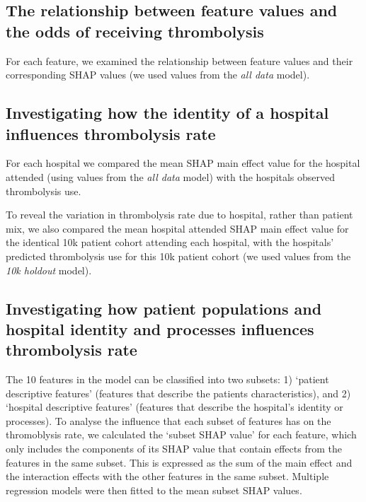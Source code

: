 \subsection{The relationship between feature values and the odds of receiving thrombolysis}

For each feature, we examined the relationship between feature values and their corresponding SHAP values (we used values from the \emph{all data} model).

\subsection{Investigating how the identity of a hospital influences thrombolysis rate}

For each hospital we compared the mean SHAP main effect value for the hospital attended (using values from the \emph{all data} model) with the hospitals observed thrombolysis use.

To reveal the variation in thrombolysis rate due to hospital, rather than patient mix, we also compared the mean hospital attended SHAP main effect value for the identical 10k patient cohort attending each hospital, with the hospitals' predicted thrombolysis use for this 10k patient cohort (we used values from the \emph{10k holdout} model).


\subsection{Investigating how patient populations and hospital identity and processes influences thrombolysis rate}

The 10 features in the model can be classified into two subsets: 1) `patient descriptive features' (features that describe the patients characteristics), and 2) `hospital descriptive features' (features that describe the hospital’s identity or processes). To analyse the influence that each subset of features has on the thromoblysis rate, we calculated the `subset SHAP value' for each feature, which only includes the components of its SHAP value that contain effects from the features in the same subset. This is expressed as the sum of the main effect and the interaction effects with the other features in the same subset. Multiple regression models were then fitted to the mean subset SHAP values.

